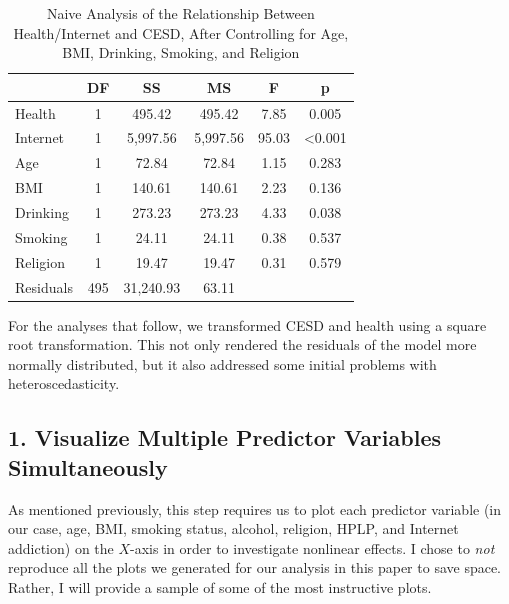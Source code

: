 \documentclass[
  man,floatsintext]{apa6}
\begin{document}
\begin{table}[tbp]

\begin{center}
\begin{threeparttable}

\caption{\label{tab:anovatab2}Naive Analysis of the Relationship Between Health/Internet and CESD, After Controlling for Age, BMI, Drinking, Smoking, and Religion}

\begin{tabular}{lccccc}
\toprule
 & DF & SS & MS & F & p\\
\midrule
Health & 1 & 495.42 & 495.42 & 7.85 & 0.005\\
Internet & 1 & 5,997.56 & 5,997.56 & 95.03 & <0.001\\
Age & 1 & 72.84 & 72.84 & 1.15 & 0.283\\
BMI & 1 & 140.61 & 140.61 & 2.23 & 0.136\\
Drinking & 1 & 273.23 & 273.23 & 4.33 & 0.038\\
Smoking & 1 & 24.11 & 24.11 & 0.38 & 0.537\\
Religion & 1 & 19.47 & 19.47 & 0.31 & 0.579\\
Residuals & 495 & 31,240.93 & 63.11 &  & \\
\bottomrule
\end{tabular}

\end{threeparttable}
\end{center}

\end{table}

For the analyses that follow, we transformed CESD and health using a square root transformation. This not only rendered the residuals of the model more normally distributed, but it also addressed some initial problems with heteroscedasticity.

\subsection{1. Visualize Multiple Predictor Variables Simultaneously}\label{visualize-multiple-predictor-variables-simultaneously}

As mentioned previously, this step requires us to plot each predictor variable (in our case, age, BMI, smoking status, alcohol, religion, HPLP, and Internet addiction) on the \(X\)-axis in order to investigate nonlinear effects. I chose to \emph{not} reproduce all the plots we generated for our analysis in this paper to save space. Rather, I will provide a sample of some of the most instructive plots.
\end{document}
